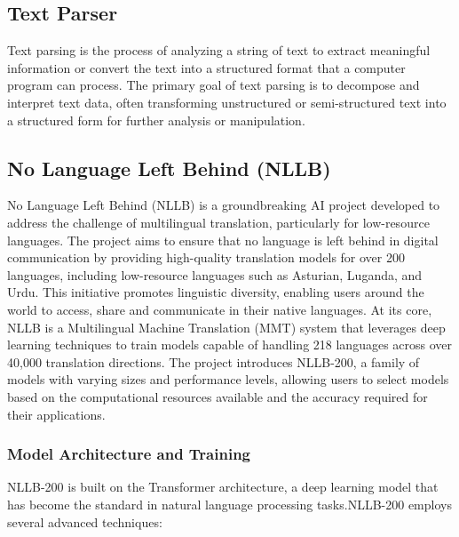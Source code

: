 \documentclass[12pt,oneside,openright,a4paper]{cpe-english-project}
\begin{document}
\subsection{Text Parser}

Text parsing is the process of analyzing a string of text to extract meaningful information or convert the text into a structured format that a computer program can process. The primary goal of text parsing is to decompose and interpret text data, often transforming unstructured or semi-structured text into a structured form for further analysis or manipulation.

\subsection {No Language Left Behind (NLLB)}

No Language Left Behind (NLLB) is a groundbreaking AI project developed to address the challenge of multilingual translation, particularly for low-resource languages. The project aims to ensure that no language is left behind in digital communication by providing high-quality translation models for over 200 languages, including low-resource languages such as Asturian, Luganda, and Urdu. This initiative promotes linguistic diversity, enabling users around the world to access, share and communicate in their native languages.
At its core, NLLB is a Multilingual Machine Translation (MMT) system that leverages deep learning techniques to train models capable of handling 218 languages across over 40,000 translation directions. The project introduces NLLB-200, a family of models with varying sizes and performance levels, allowing users to select models based on the computational resources available and the accuracy required for their applications.

\subsubsection{Model Architecture and Training}

NLLB-200 is built on the Transformer architecture, a deep learning model that has become the standard in natural language processing tasks.NLLB-200 employs several advanced techniques:
\end{document}
